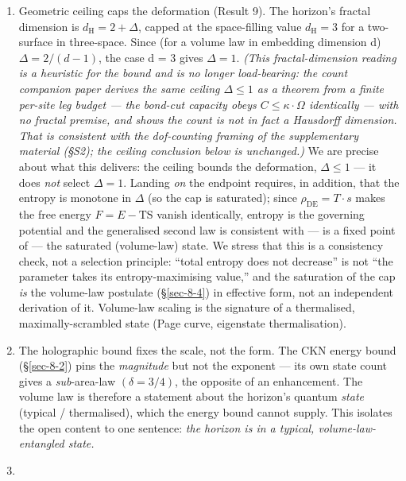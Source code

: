 \documentclass[preprint,12pt]{elsarticle}
\providecommand{\tightlist}{\setlength{\itemsep}{0pt}\setlength{\parskip}{0pt}}
\begin{document}
\begin{enumerate}
\def\labelenumi{\arabic{enumi}.}
\tightlist
\item
  Geometric ceiling caps the deformation (Result 9). The horizon's
  fractal dimension is \(d_{\mathrm{H}} = 2 + \Delta\), capped at the
  space-filling value \(d_{\mathrm{H}} = 3\) for a two-surface in
  three-space. Since (for a volume law in embedding dimension d)
  \(\Delta  = 2/(d-1)\), the case d = 3 gives \(\Delta  = 1\).
  \emph{(This fractal-dimension reading is a heuristic for the bound and
  is no longer load-bearing: the count companion paper
  \citep{Pandev:2026count} derives the same ceiling \(\Delta  \leq  1\)
  as a theorem from a finite per-site leg budget --- the bond-cut
  capacity obeys \(C \leq  \kappa \cdot\)\textbar{}\(\Omega\)\textbar{}
  identically --- with no fractal premise, and shows the count is not in
  fact a Hausdorff dimension. That is consistent with the dof-counting
  framing of the supplementary material (§S2); the ceiling conclusion
  below is unchanged.)} We are precise about what this delivers: the
  ceiling bounds the deformation, \(\Delta  \leq  1\) --- it does
  \emph{not} select \(\Delta  = 1\). Landing \emph{on} the endpoint
  requires, in addition, that the entropy is monotone in \(\Delta\) (so
  the cap is saturated); since \(\rho _\mathrm{DE} = T\cdot s\) makes
  the free energy \(F = E - \mathrm{TS}\) vanish identically, entropy is
  the governing potential and the generalised second law is consistent
  with --- is a fixed point of --- the saturated (volume-law) state. We
  stress that this is a consistency check, not a selection principle:
  ``total entropy does not decrease'' is not ``the parameter takes its
  entropy-maximising value,'' and the saturation of the cap \emph{is}
  the volume-law postulate (§\ref{sec-8-4}) in effective form, not an
  independent derivation of it. Volume-law scaling is the signature of a
  thermalised, maximally-scrambled state (Page curve, eigenstate
  thermalisation).
\item
  The holographic bound fixes the scale, not the form. The CKN energy
  bound (§\ref{sec-8-2}) pins the \emph{magnitude} but not the exponent
  --- its own state count gives a \emph{sub}-area-law
  \((\delta  = 3/4)\), the opposite of an enhancement. The volume law is
  therefore a statement about the horizon's quantum \emph{state}
  (typical / thermalised), which the energy bound cannot supply. This
  isolates the open content to one sentence: \emph{the horizon is in a
  typical, volume-law-entangled state.}
\item

\end{enumerate}
\end{document}
